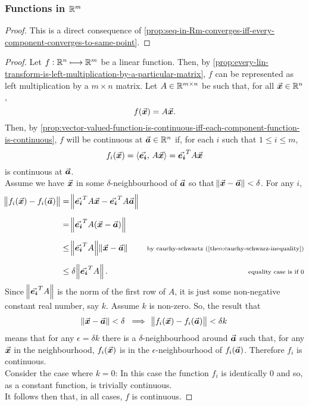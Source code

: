 \documentclass[../MathsNotesBase.tex]{subfiles}
\begin{document}
	
	\nl[18]
	\subsubsection{Functions in $\mathbb{R}^{m}$}
	\bigskip
	\begin{proof}
		This is a direct consequence of \autoref{prop:seq-in-Rm-converges-iff-every-component-converges-to-same-point}.
	\end{proof}

	\bigskip
	\begin{proof}
		Let ${ f: \mathbb{R}^{n} \longmapsto \mathbb{R}^{m} }$ be a linear function. Then, by \autoref{prop:every-lin-transform-is-left-multiplication-by-a-particular-matrix}, $f$ can be represented as left multiplication by a ${ m \times n }$ matrix. Let ${ A \in \mathbb{R}^{m \times n} }$ be such that, for all ${ \vec{\bm{x}} \in \mathbb{R}^{n} }$,
		\[ f(\vec{\bm{x}}) = A \vec{\bm{x}}. \]
		Then, by \autoref{prop:vector-valued-function-is-continuous-iff-each-component-function-is-continuous}, $f$ will be continuous at ${ \vec{\bm{a}} \in \mathbb{R}^{n} }$ if, for each $i$ such that ${ 1 \leq i \leq m }$,
		\[ f_i(\vec{\bm{x}}) = \langle \vec{\bm{e_i}},\, A\vec{\bm{x}} \rangle = \vec{\bm{e_i}}^T A \vec{\bm{x}} \]
		is continuous at $\vec{\bm{a}}$.\\
		Assume we have $\vec{\bm{x}}$ in some $\delta$-neighbourhood of $\vec{\bm{a}}$ so that ${ \norm{\vec{\bm{x}} - \vec{\bm{a}}} < \delta }$. For any $i$,
		\[\begin{aligned}
			\norm{f_i(\x) - f_i(\a)} &= \norm{\e{i}^T A \x - \e{i}^T A \a} \nn
			&= \norm{\e{i}^T A (\x - \a)}  &\sidecomment{} \nn
			&\leq \norm{\e{i}^T A} \norm{\x - \a}  &\sidecomment{by cauchy-schwartz (\autoref{theo:cauchy-schwarz-inequality})} \nn
			&\leq \delta \norm{\e{i}^T A}.  &\sidecomment{equality case is if 0}
		\end{aligned}\]
		Since $\norm{\vec{\bm{e_i}}^T A}$ is the norm of the first row of $A$, it is just some non-negative constant real number, say $k$. Assume $k$ is non-zero. So, the result that
		\[ \norm{\vec{\bm{x}} - \vec{\bm{a}}} < \delta \; \implies \; \norm{f_i(\vec{\bm{x}}) - f_i(\vec{\bm{a}})} < \delta k \]
		means that for any ${ \epsilon = \delta k }$ there is a $\delta$-neighbourhood around $\vec{\bm{a}}$ such that, for any $\vec{\bm{x}}$ in the neighbourhood, $f_i(\vec{\bm{x}})$ is in the $\epsilon$-neighbourhood of $f_i(\vec{\bm{a}})$. Therefore $f_i$ is continuous.\\
		Consider the case where ${ k = 0 }$: In this case the function $f_i$ is identically 0 and so, as a constant function, is trivially continuous.\\
		It follows then that, in all cases, $f$ is continuous.
	\end{proof}
\end{document}
